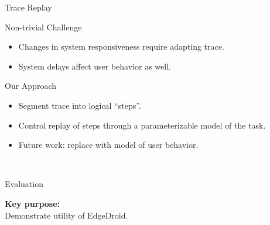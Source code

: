 \documentclass[aspectratio=1610]{beamer}
\begin{document}
\begin{frame}{Trace Replay}
    \begin{block}{Non-trivial Challenge}
        \begin{itemize}
            \item Changes in system responsiveness require adapting trace.
            \item System delays affect user behavior as well.
        \end{itemize}
    \end{block}
    \begin{block}{Our Approach}
        \begin{itemize}
            \item Segment trace into logical ``steps''.
            \item Control replay of steps through a parameterizable model of the task.
            \item Future work: replace with model of user behavior.
        \end{itemize}
    \end{block}
    \begin{center}
        \\
    \end{center}
\end{frame}

\begin{frame}{Evaluation}
    \begin{center}
        \Large%
        \textbf{Key purpose:}\\
        Demonstrate utility of EdgeDroid.\\
    \end{center}
\end{frame}
\end{document}
